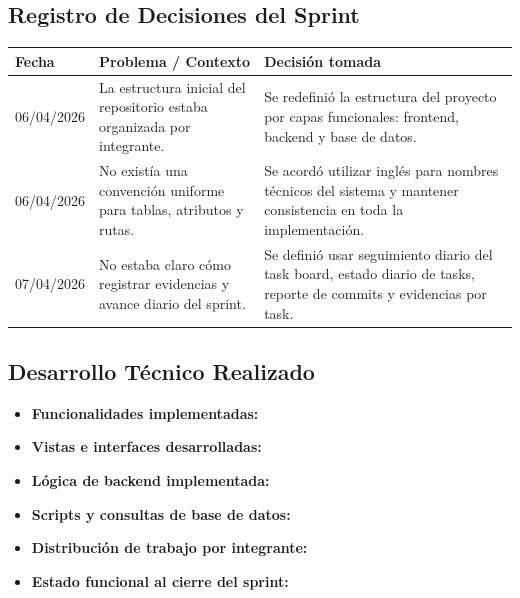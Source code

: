\documentclass[12pt,a4paper]{article}
\begin{document}
\subsection{Registro de Decisiones del Sprint}

\begin{longtable}{|p{2.5cm}|p{5cm}|p{5cm}|}
\hline
\textbf{Fecha} & \textbf{Problema / Contexto} & \textbf{Decisión tomada} \\
\hline
06/04/2026 & La estructura inicial del repositorio estaba organizada por integrante. & Se redefinió la estructura del proyecto por capas funcionales: frontend, backend y base de datos. \\
\hline
06/04/2026 & No existía una convención uniforme para tablas, atributos y rutas. & Se acordó utilizar inglés para nombres técnicos del sistema y mantener consistencia en toda la implementación. \\
\hline
07/04/2026 & No estaba claro cómo registrar evidencias y avance diario del sprint. & Se definió usar seguimiento diario del task board, estado diario de tasks, reporte de commits y evidencias por task. \\
\hline
\end{longtable}

\subsection{Desarrollo Técnico Realizado}


\begin{itemize}
    \item \textbf{Funcionalidades implementadas:} %
    \item \textbf{Vistas e interfaces desarrolladas:} %
    \item \textbf{Lógica de backend implementada:} %
    \item \textbf{Scripts y consultas de base de datos:} %
    \item \textbf{Distribución de trabajo por integrante:} %
    \item \textbf{Estado funcional al cierre del sprint:} %
\end{itemize}



\end{document}
